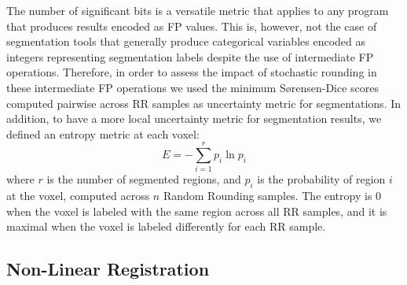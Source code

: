 The number of significant bits is a versatile metric that applies to any program that produces results encoded as FP values. 
This is, however, not the case of segmentation tools that generally produce categorical variables encoded as integers representing segmentation labels 
despite the use of intermediate FP operations.
Therefore, 
in order to assess the impact of stochastic rounding in these intermediate FP operations
we used the minimum Sørensen-Dice scores computed pairwise across RR samples as uncertainty metric for segmentations. In addition, to have a more local uncertainty metric for segmentation results, we defined an entropy metric at each voxel:
\begin{equation}
    \label{eq:entropy}
    E = -\sum_{i=1}^{r}p_i\ln p_i
\end{equation}
where $r$ is the number of segmented regions, and $p_i$ is the probability of region $i$ at the voxel, computed across $n$ Random Rounding samples. 
The entropy is 0 when the voxel is labeled with the same region across all RR samples, and it is maximal when the voxel is labeled differently for each RR sample.

\subsection{Non-Linear Registration}




